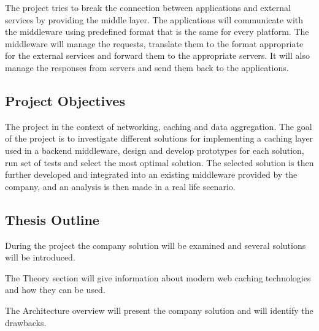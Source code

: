 The project tries to break the connection between applications and external services by providing the middle layer. The applications will communicate with the middleware using predefined format that is the same for every platform. The middleware will manage the requests, translate them to the format appropriate for the external services and forward them to the appropriate servers. It will also manage the responses from servers and send them back to the applications.


\subsection{Project Objectives}

The project in the context of networking, caching and data aggregation. The goal of the project is to investigate different solutions for implementing a caching layer used in a backend middleware, design and develop prototypes for each solution, run set of tests and select the most optimal solution.
The selected solution is then further developed and integrated into an existing middleware provided by the company, and an analysis is then made in a real life scenario.


\subsection{Thesis Outline}

During the project the company solution will be examined and several solutions will be introduced. 

The Theory section will give information about modern web caching technologies and how they can be used. 

The Architecture overview will present the company solution and will identify the drawbacks.



\newpage
